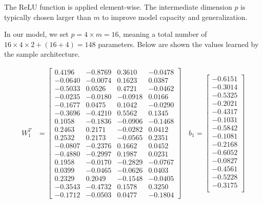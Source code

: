 \documentclass[algorithms,article,submit,pdftex,moreauthors]{Definitions/mdpi}
\begin{document}
The ReLU function is applied element-wise. The intermediate dimension $p$ is typically chosen larger than $m$ to improve model capacity and generalization. 

In our model, we set $p = 4 \times m = 16$, meaning a total number of $16 \times 4 \times 2 + (16 + 4) = 148$ parameters.
Below are shown the values learned by the sample architecture.

\begin{align*}
    W_1^T &=
\begin{bmatrix}
 0.4196 & -0.8769 &  0.3610 & -0.0478 \\
-0.0640 & -0.0074 &  0.1623 &  0.0387 \\
-0.5033 &  0.0526 &  0.4721 & -0.0462 \\
-0.0235 & -0.0180 & -0.0918 &  0.0166 \\
-0.1677 &  0.0475 &  0.1042 & -0.0290 \\
-0.3696 & -0.4210 &  0.5562 &  0.1345 \\
 0.1058 & -0.1836 & -0.0906 & -0.1468 \\
 0.2463 &  0.2171 & -0.0282 &  0.0412 \\
 0.2532 &  0.2173 & -0.0565 &  0.2351 \\
-0.0807 & -0.2376 &  0.1662 &  0.0452 \\
-0.4880 & -0.2997 &  0.1987 &  0.0231 \\
 0.1958 & -0.0170 & -0.2829 & -0.0767 \\
 0.0399 & -0.0465 & -0.0626 &  0.0403 \\
 0.2329 &  0.2049 & -0.1548 & -0.0405 \\
-0.3543 & -0.4732 &  0.1578 &  0.3250 \\
-0.1712 & -0.0503 &  0.0477 & -0.1804
\end{bmatrix}
 \quad
    b_1 =   \begin{bmatrix}
-0.6151 \\
-0.3014 \\
-0.5325 \\
-0.2021 \\
-0.4317 \\
-0.1031 \\
-0.5842 \\
-0.1081 \\
-0.2168 \\
-0.6052 \\
-0.0827 \\
-0.4561 \\
-0.5228 \\
-0.3175 \\

\end{bmatrix}
\end{align*}
\end{document}
